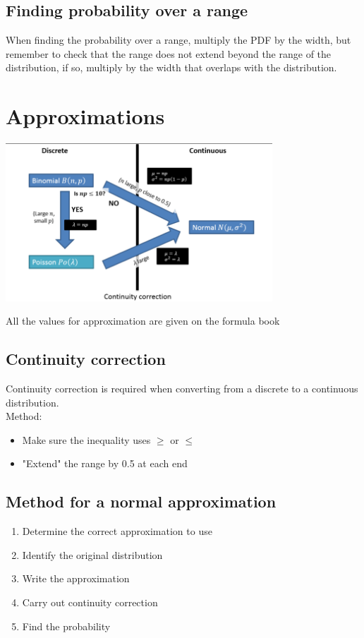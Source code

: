 \documentclass{article}[18pt]
\begin{document}
\subsection{Finding probability over a range}
When finding the probability over a range, multiply the PDF by the width, but remember to check that the range does not extend beyond the range of the distribution, if so, multiply by the width that overlaps with the distribution.
\section{Approximations}
\begin{center}
\includegraphics[width=10cm]{approx.png}
\end{center}
All the values for approximation are given on the formula book
\subsection{Continuity correction}
Continuity correction is required when converting from a discrete to a continuous distribution.\\
Method:
\begin{itemize}
\item Make sure the inequality uses $\geqslant$ or $\leqslant$
\item "Extend" the range by 0.5 at each end
\end{itemize}
\newpage
\subsection{Method for a normal approximation}
\begin{enumerate}
\item Determine the correct approximation to use
\item Identify the original distribution
\item Write the approximation
\item Carry out continuity correction
\item Find the probability
\end{enumerate}
\end{document}
